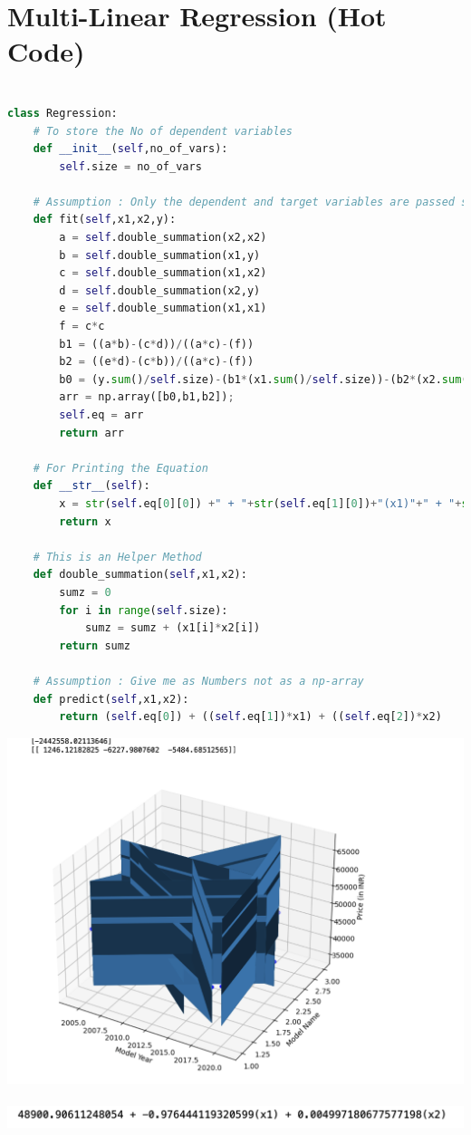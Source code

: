 \documentclass{article}
\begin{document}
\section{Multi-Linear Regression (Hot Code)}
\begin{lstlisting}[language=Python]

class Regression:
	# To store the No of dependent variables 
	def __init__(self,no_of_vars):
		self.size = no_of_vars
	
	# Assumption : Only the dependent and target variables are passed separately
	def fit(self,x1,x2,y):
		a = self.double_summation(x2,x2)
		b = self.double_summation(x1,y)
		c = self.double_summation(x1,x2)
		d = self.double_summation(x2,y)
		e = self.double_summation(x1,x1)
		f = c*c
		b1 = ((a*b)-(c*d))/((a*c)-(f))
		b2 = ((e*d)-(c*b))/((a*c)-(f))
		b0 = (y.sum()/self.size)-(b1*(x1.sum()/self.size))-(b2*(x2.sum()/self.size))
		arr = np.array([b0,b1,b2]);
		self.eq = arr
		return arr
	
	# For Printing the Equation
	def __str__(self):
		x = str(self.eq[0][0]) +" + "+str(self.eq[1][0])+"(x1)"+" + "+str(self.eq[2][0])+"(x2)"  
		return x
	
	# This is an Helper Method 
	def double_summation(self,x1,x2):
		sumz = 0
		for i in range(self.size):
			sumz = sumz + (x1[i]*x2[i])
		return sumz
	
	# Assumption : Give me as Numbers not as a np-array
	def predict(self,x1,x2):
		return (self.eq[0]) + ((self.eq[1])*x1) + ((self.eq[2])*x2)    
\end{lstlisting}

\includegraphics[scale=0.4]{images/4.png}\\\\
\includegraphics[scale=0.4]{images/5.png}
\\\\
\end{document}
